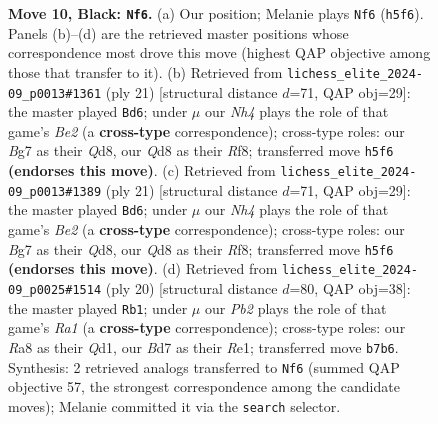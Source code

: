 \documentclass[11pt]{article}
\begin{document}
\begin{figure}[p]
\caption{\textbf{Move 10, Black: \texttt{Nf6}.} (a) Our position; Melanie plays \texttt{Nf6} (\texttt{h5f6}). Panels (b)--(d) are the retrieved master positions whose correspondence most drove this move (highest QAP objective among those that transfer to it). (b) Retrieved from \texttt{lichess\_elite\_2024-09\_p0013\#1361} (ply 21) [structural distance $d$=71, QAP obj=29]: the master played \texttt{Bd6}; under $\mu$ our \emph{Nh4} plays the role of that game's \emph{Be2} (a \textbf{cross-type} correspondence); cross-type roles: our \emph{B}g7 as their \emph{Q}d8, our \emph{Q}d8 as their \emph{R}f8; transferred move \texttt{h5f6} \textbf{(endorses this move)}. (c) Retrieved from \texttt{lichess\_elite\_2024-09\_p0013\#1389} (ply 21) [structural distance $d$=71, QAP obj=29]: the master played \texttt{Bd6}; under $\mu$ our \emph{Nh4} plays the role of that game's \emph{Be2} (a \textbf{cross-type} correspondence); cross-type roles: our \emph{B}g7 as their \emph{Q}d8, our \emph{Q}d8 as their \emph{R}f8; transferred move \texttt{h5f6} \textbf{(endorses this move)}. (d) Retrieved from \texttt{lichess\_elite\_2024-09\_p0025\#1514} (ply 20) [structural distance $d$=80, QAP obj=38]: the master played \texttt{Rb1}; under $\mu$ our \emph{Pb2} plays the role of that game's \emph{Ra1} (a \textbf{cross-type} correspondence); cross-type roles: our \emph{R}a8 as their \emph{Q}d1, our \emph{B}d7 as their \emph{R}e1; transferred move \texttt{b7b6}. Synthesis: 2 retrieved analogs transferred to \texttt{Nf6} (summed QAP objective 57, the strongest correspondence among the candidate moves); Melanie committed it via the \texttt{search} selector.}
\label{fig:thought-m19}
\end{figure}

\clearpage
\end{document}
